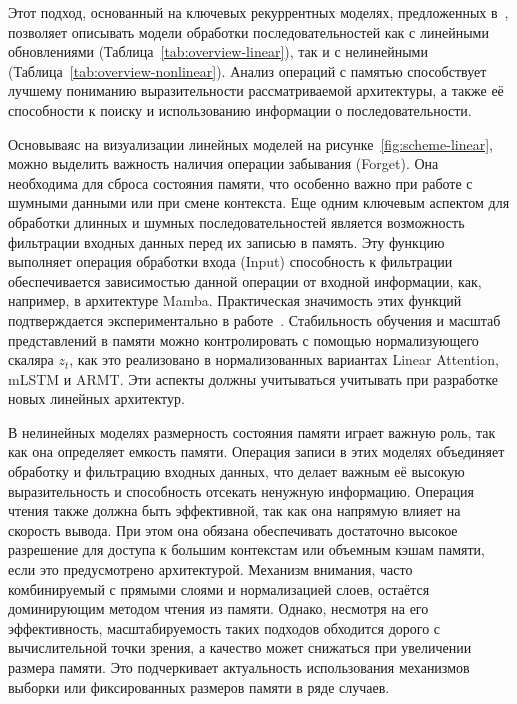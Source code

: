 Этот подход, основанный на ключевых рекуррентных моделях, предложенных в~\cite{yang2024parallelizing}, позволяет описывать модели обработки последовательностей как с линейными обновлениями (Таблица~\ref{tab:overview-linear}), так и с нелинейными (Таблица~\ref{tab:overview-nonlinear}). Анализ операций с памятью способствует лучшему пониманию выразительности рассматриваемой архитектуры, а также её способности к поиску и использованию информации о последовательности.

Основываяс на визуализации линейных моделей на рисунке~\ref{fig:scheme-linear}, можно выделить важность наличия операции забывания (Forget). Она необходима для сброса состояния памяти, что особенно важно при работе с шумными данными или при смене контекста. Еще одним ключевым аспектом для обработки длинных и шумных последовательностей является возможность фильтрации входных данных перед их записью в память. Эту функцию выполняет операция обработки входа (Input) способность к фильтрации обеспечивается зависимостью данной операции от входной информации, как, например, в архитектуре Mamba. Практическая значимость этих функций подтверждается экспериментально в работе~\cite{gu2023mamba}. Стабильность обучения и масштаб представлений в памяти можно контролировать с помощью нормализующего скаляра \(z_t\), как это реализовано в нормализованных вариантах Linear Attention, mLSTM и ARMT. Эти аспекты должны учитываться учитывать при разработке новых линейных архитектур.

В нелинейных моделях размерность состояния памяти играет важную роль, так как она определяет емкость памяти. Операция записи в этих моделях объединяет обработку и фильтрацию входных данных, что делает важным её высокую выразительность и способность отсекать ненужную информацию. Операция чтения также должна быть эффективной, так как она напрямую влияет на скорость вывода. При этом она обязана обеспечивать достаточно высокое разрешение для доступа к большим контекстам или объемным кэшам памяти, если это предусмотрено архитектурой. Механизм внимания, часто комбинируемый с прямыми слоями и нормализацией слоев, остаётся доминирующим методом чтения из памяти. Однако, несмотря на его эффективность, масштабируемость таких подходов обходится дорого с вычислительной точки зрения, а качество может снижаться при увеличении размера памяти. Это подчеркивает актуальность использования механизмов выборки или фиксированных размеров памяти в ряде случаев.


